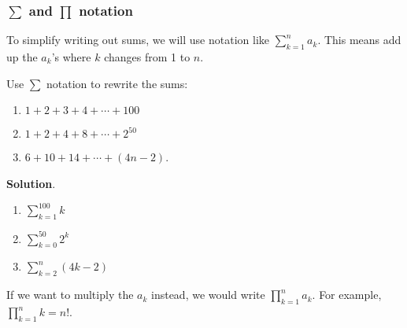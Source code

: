 \documentclass[11pt,]{book}
\theoremstyle{ptxplainnotitle}
\theoremstyle{ptxplaintitle}
\theoremstyle{ptxdefinitionnotitle}
\theoremstyle{ptxdefinitiontitle}
\theoremstyle{ptxdefinitionnotitle}
\theoremstyle{ptxdefinitiontitle}
\theoremstyle{ptxdefinitionnotitle}
\theoremstyle{ptxdefinitiontitle}
\theoremstyle{ptxdefinitiontitlenonumber}
\theoremstyle{ptxdefinitiontitlenonumber}
\numberwithin{equation}{chapter}
\renewcommand{\d}{\displaystyle}
\begin{document}
\subsubsection[{\(\sum\) and \(\prod\) notation}]{\(\sum\) and \(\prod\) notation}\label{subsubsection-3}
\hypertarget{p-211}{}%
To simplify writing out sums, we will use notation like \(\d\sum_{k=1}^n a_k\). This means add up the \(a_k\)'s where \(k\) changes from 1 to \(n\).%
\begin{example}\label{example-13}
\hypertarget{p-212}{}%
Use \(\sum\) notation to rewrite the sums:%
\par
\hypertarget{p-213}{}%
\leavevmode%
\begin{enumerate}
\item\hypertarget{li-114}{}\(1 + 2 + 3 + 4 + \cdots + 100\)%
\item\hypertarget{li-115}{}\(1 + 2 + 4 + 8 + \cdots + 2^{50}\)%
\item\hypertarget{li-116}{}\(6 + 10 + 14 + \cdots + (4n - 2)\).%
\end{enumerate}
%
\par\smallskip%
\noindent\textbf{Solution}.\hypertarget{solution-19}{}\quad%
\hypertarget{p-214}{}%
\leavevmode%
\begin{enumerate}
\item\hypertarget{li-117}{}\(\d\sum_{k=1}^{100} k\)%
\item\hypertarget{li-118}{}\(\d\sum_{k=0}^{50} 2^k\)%
\item\hypertarget{li-119}{}\(\d\sum_{k=2}^{n} (4k -2)\)%
\end{enumerate}
%
\end{example}
\hypertarget{p-215}{}%
If we want to multiply the \(a_k\) instead, we would write \(\d\prod_{k=1}^n a_k\). For example, \(\d\prod_{k=1}^n k = n!\).%
\typeout{************************************************}
\typeout{************************************************}
\end{document}
